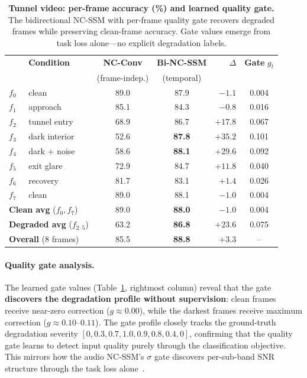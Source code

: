 \documentclass[10pt,twocolumn,letterpaper]{article}
\begin{document}
\begin{table}[t]
\centering
\caption{\textbf{Tunnel video: per-frame accuracy (\%) and learned quality gate.} The bidirectional NC-SSM with per-frame quality gate recovers degraded frames while preserving clean-frame accuracy. Gate values emerge from task loss alone---no explicit degradation labels.}
\label{tab:tunnel}
\footnotesize
\setlength{\tabcolsep}{3pt}
\begin{tabular}{@{}llcc rc@{}}
\toprule
& \textbf{Condition} & \textbf{NC-Conv} & \textbf{Bi-NC-SSM} & $\Delta$ & \textbf{Gate} $g_t$ \\
& & (frame-indep.) & (temporal) & & \\
\midrule
$f_0$ & clean        & 89.0 & 87.9 & $-1.1$          & 0.004 \\
$f_1$ & approach     & 85.1 & 84.3 & $-0.8$          & 0.016 \\
$f_2$ & tunnel entry & 68.9 & 86.7 & $+17.8$         & 0.067 \\
$f_3$ & dark interior& 52.6 & \textbf{87.8} & $\mathbf{+35.2}$ & 0.101 \\
$f_4$ & dark + noise & 58.6 & \textbf{88.1} & $\mathbf{+29.6}$ & 0.092 \\
$f_5$ & exit glare   & 72.9 & 84.7 & $+11.8$         & 0.040 \\
$f_6$ & recovery     & 81.7 & 83.1 & $+1.4$          & 0.026 \\
$f_7$ & clean        & 89.0 & 88.1 & $-1.0$          & 0.004 \\
\midrule
\multicolumn{2}{l}{\textbf{Clean avg} ($f_0, f_7$)}    & 89.0 & \textbf{88.0} & $-1.0$  & 0.004 \\
\multicolumn{2}{l}{\textbf{Degraded avg} ($f_{2\text{--}5}$)} & 63.2 & \textbf{86.8} & $\mathbf{+23.6}$ & 0.075 \\
\multicolumn{2}{l}{\textbf{Overall} (8 frames)}         & 85.5 & \textbf{88.8} & $+3.3$  & -- \\
\bottomrule
\end{tabular}
\end{table}

\paragraph{Quality gate analysis.}
The learned gate values (Table~\ref{tab:tunnel}, rightmost column) reveal that the gate \textbf{discovers the degradation profile without supervision}:
clean frames receive near-zero correction ($g \approx 0.00$), while the darkest frames receive maximum correction ($g \approx 0.10\text{--}0.11$).
The gate profile closely tracks the ground-truth degradation severity $[0, 0.3, 0.7, 1.0, 0.9, 0.8, 0.4, 0]$, confirming that the quality gate learns to detect input quality purely through the classification objective.
This mirrors how the audio NC-SSM's $\sigma$ gate discovers per-sub-band SNR structure through the task loss alone~\cite{choi2026ncssm}.
\end{document}
